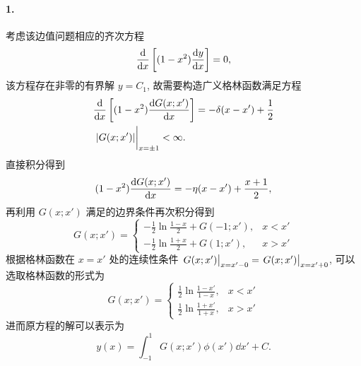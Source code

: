 \documentclass[12pt]{article}
\begin{document}
\maketitle

\paragraph{1.}
考虑该边值问题相应的齐次方程
\begin{equation*}
	\dv{x}\left[(1 - x^2)\dv{y}{x}\right] = 0,
\end{equation*}
该方程存在非零的有界解 $y = C_1$, 故需要构造广义格林函数满足方程
\begin{align*}
	&\dv{x}\left[(1 - x^2)\dv{G(x; x')}{x}\right] = -\delta(x - x') + \frac{1}{2} \\
	&\eval{\abs{G(x; x')}}_{x = \pm 1} < \infty.
\end{align*}
直接积分得到
\begin{equation*}
	(1 - x^2) \dv{G(x; x')}{x} = -\eta(x - x') + \frac{x + 1}{2},
\end{equation*}
再利用 $G(x; x')$ 满足的边界条件再次积分得到
\begin{equation*}
	G(x; x') = \begin{cases}
		-\frac{1}{2} \ln\frac{1 - x}{2} + G(-1; x'), &x < x' \\
		-\frac{1}{2} \ln\frac{1 + x}{2} + G(1; x'), &x > x'
 	\end{cases}
\end{equation*}
根据格林函数在 $x = x'$ 处的连续性条件 $\eval{G(x; x')}_{x = x' - 0} = \eval{G(x; x')}_{x = x' + 0}$, 可以选取格林函数的形式为
\begin{equation*}
	G(x; x') = \begin{cases}
		\frac{1}{2} \ln\frac{1 - x'}{1 - x}, &x < x' \\
		\frac{1}{2} \ln\frac{1 + x'}{1 + x}, &x > x'
 	\end{cases}
\end{equation*}
进而原方程的解可以表示为
\begin{equation*}
	y(x) = \int_{-1}^{1} G(x; x') \phi(x') \dd{x'} + C.
\end{equation*}
\end{document}
